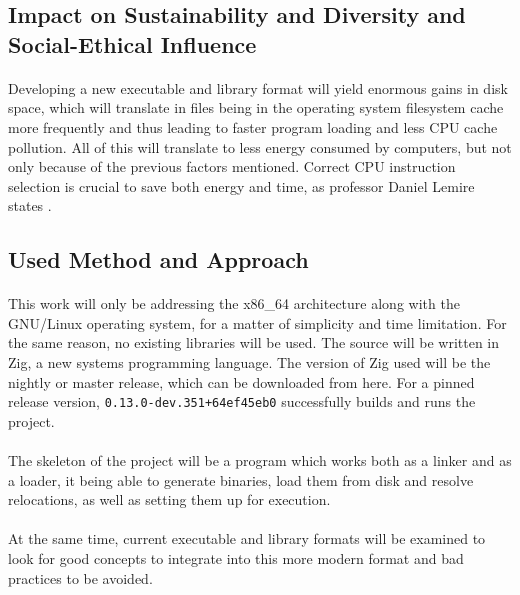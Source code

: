 \documentclass[12pt]{article}
\begin{document}
	\subsection{Impact on Sustainability and Diversity and Social-Ethical Influence}
    \paragraph{} Developing a new executable and library format will yield enormous gains in disk space, which will translate in files being in the operating system filesystem cache more frequently and thus leading to faster program loading and less CPU cache pollution. All of this will translate to less energy consumed by computers, but not only because of the previous factors mentioned. Correct CPU instruction selection is crucial to save both energy and time, as professor Daniel Lemire states \cite{lemire-energy}. 
	\subsection{Used Method and Approach}
	\paragraph{}This work will only be addressing the x86\_64 architecture along with the GNU/Linux operating system, for a matter of simplicity and time limitation. For the same reason, no existing libraries will be used. The source will be written in Zig\cite{zig}, a new systems programming language. The version of Zig used will be the nightly or master release, which can be downloaded from here\cite{zig-download}. For a pinned release version, \verb|0.13.0-dev.351+64ef45eb0| successfully builds and runs the project.
    
    \paragraph{}The skeleton of the project will be a program which works both as a linker and as a loader, it being able to generate binaries, load them from disk and resolve relocations, as well as setting them up for execution.
    
    \paragraph{}At the same time, current executable and library formats will be examined to look for good concepts to integrate into this more modern format and bad practices to be avoided.
    
\end{document}
